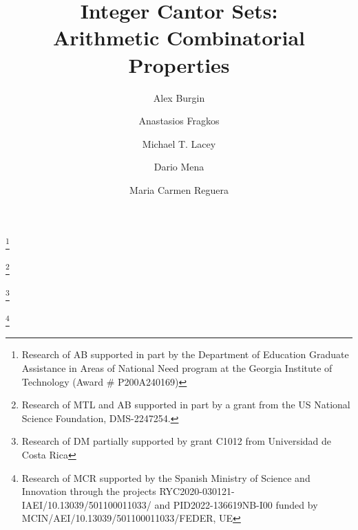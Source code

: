 \documentclass[12pt]{amsart}
\numberwithin{equation}{section}
\theoremstyle{definition}
\begin{document}
\title[Integer Cantor Sets]{Integer Cantor Sets:\\ Arithmetic Combinatorial Properties}

\author[Burgin]{Alex Burgin} 
    \address{School of Mathematics, Georgia Institute of Technology, Atlanta GA 30332, USA}
    \thanks{Research of AB supported in part by the Department of Education Graduate Assistance in Areas of National Need program at the Georgia Institute of Technology (Award \# P200A240169)}

\author[Fragkos]{Anastasios Fragkos}
\address{ School of Mathematics, Georgia Institute of Technology, Atlanta GA 30332, USA}

\author[Lacey]{Michael T. Lacey} 
    \address{ School of Mathematics, Georgia Institute of Technology, Atlanta GA 30332, USA}
    \thanks{Research of MTL and AB supported in part by a grant from the US National Science Foundation, DMS-2247254.}

 \author[Mena]{Dario Mena}
    \address{Centro de Investigaci\'{o}n en Matem\'{a}tica Pura y Aplicada \\ Escuela de Matem\'{a}tica, Universidad de Costa Rica}
    \thanks{Research of DM partially supported by grant C1012 from Universidad de Costa Rica}

\author[Reguera]{Maria Carmen Reguera} 
 \address{Universidad de M\'alaga}
    \thanks{Research of MCR supported by the Spanish Ministry of Science and Innovation through the projects RYC2020-030121-IAEI/10.13039/501100011033/ and PID2022-136619NB-I00 funded by MCIN/AEI/10.13039/501100011033/FEDER, UE}
\end{document}
